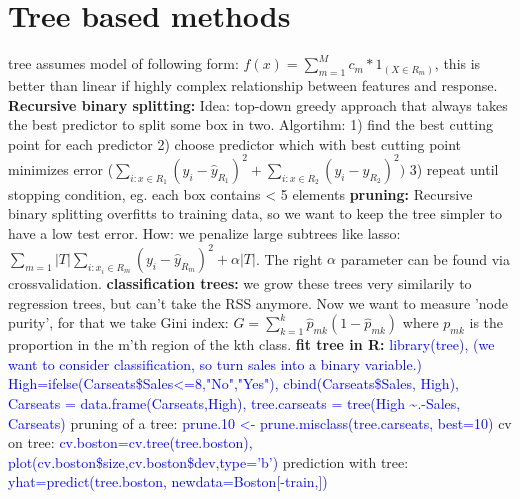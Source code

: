 \section{Tree based methods}
tree assumes model of following form: 
$f(x) = \sum_{m=1}^M c_m*1_{(X \in R_m)}$, this is better than linear if highly complex relationship between features and response. 
\textbf{Recursive binary splitting: }
Idea: top-down greedy approach that always takes the best predictor to split some box in two. Algortihm:
1) find the best cutting point for each predictor
2) choose predictor which with best cutting point minimizes error ($\sum_{i:x \in R_1}(y_i-\hat y_{R_1})^2+\sum_{i:x \in R_2}(y_i-\hat y_{R_2})^2)$
3) repeat until stopping condition, eg. each box contains < 5 elements
\textbf{pruning: } Recursive binary splitting overfitts to training data, so we want to keep the tree simpler to have a low test error. How: we penalize large subtrees like lasso: $\sum_{m=1}{|T|}\sum_{i: x_i \in R_m}(y_i - \hat y_{R_m})^2 + \alpha|T|$. The right $\alpha$ parameter can be found via crossvalidation. 
\textbf{classification trees: } we grow these trees very similarily to regression trees, but can't take the RSS anymore. Now we want to measure 'node purity', for that we take Gini index: $G = \sum_{k=1}^k \hat p_{mk}(1-\hat p_{mk})$ where $p_{mk}$ is the proportion in the m'th region of the kth class.
\textbf{fit tree in R:} \textcolor{blue}{library(tree), (we want to consider classification, so turn sales into a binary variable.)
High=ifelse(Carseats\$Sales<=8,"No","Yes"), cbind(Carseats\$Sales, High), Carseats = data.frame(Carseats,High), tree.carseats = tree(High \textasciitilde .-Sales, Carseats)} pruning of a tree: \textcolor{blue}{prune.10 <- prune.misclass(tree.carseats, best=10)} cv on tree: \textcolor{blue}{cv.boston=cv.tree(tree.boston), plot(cv.boston\$size,cv.boston\$dev,type='b')} prediction with tree: \textcolor{blue}{yhat=predict(tree.boston, newdata=Boston[-train,])}